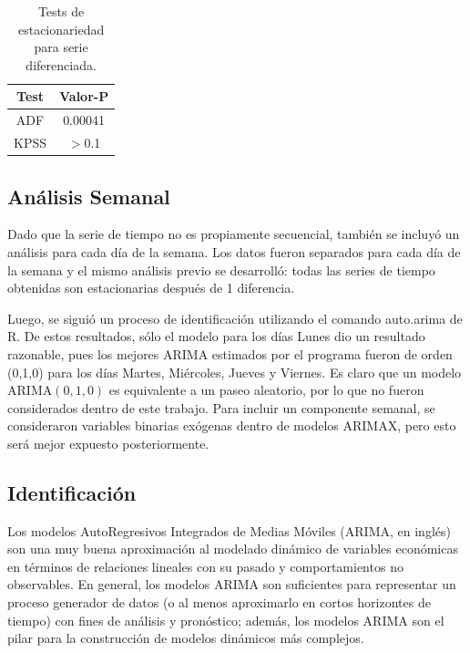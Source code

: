 \documentclass[conference]{IEEEtran}
\begin{document}
\begin{table}[H]
\centering
\caption{Tests de estacionariedad para serie diferenciada.}
\label{tab:estac_diff}
\begin{tabular}{cc}
\hline
\textbf{Test} & \textbf{Valor-P} \\ \hline
ADF & 0.00041 \\
KPSS & $>$0.1 \\ \hline
\end{tabular}
\end{table}

\subsection{Análisis Semanal}
Dado que la serie de tiempo no es propiamente secuencial, también se incluyó un análisis para cada día de la semana. Los datos fueron separados para cada día de la semana y el mismo análisis previo se desarrolló: todas las series de tiempo obtenidas son estacionarias después de 1 diferencia.

Luego, se siguió un proceso de identificación utilizando el comando auto.arima de R. De estos resultados, sólo el modelo para los días Lunes dio un resultado razonable, pues los mejores ARIMA estimados por el programa fueron de orden (0,1,0) para los días Martes, Miércoles, Jueves y Viernes. Es claro que un modelo $\mathrm{ARIMA}(0,1,0)$ es equivalente a un paseo aleatorio, por lo que no fueron considerados dentro de este trabajo. Para incluir un componente semanal, se consideraron variables binarias exógenas dentro de modelos ARIMAX, pero esto será mejor expuesto posteriormente.

\subsection{Identificación}
Los modelos AutoRegresivos Integrados de Medias Móviles (ARIMA, en inglés) son una muy buena aproximación al modelado dinámico de variables económicas en términos de relaciones lineales con su pasado y comportamientos no observables. En general, los modelos ARIMA son suficientes para representar un proceso generador de datos (o al menos aproximarlo en cortos horizontes de tiempo) con fines de análisis y pronóstico; además, los modelos ARIMA son el pilar para la construcción de modelos dinámicos más complejos.
\end{document}
